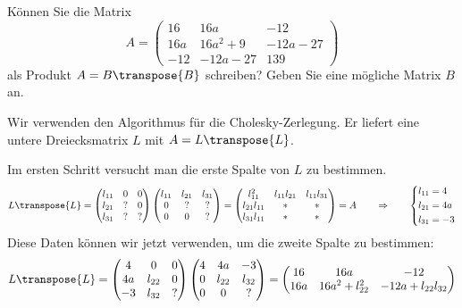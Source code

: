 Können Sie die Matrix
\[
A=\begin{pmatrix}
16& 16a&-12\\
16a&16a^2+9&-12a-27\\
-12& -12a-27&139
\end{pmatrix}
\]
als Produkt $A=B\transpose{B}$ schreiben? Geben Sie eine mögliche Matrix $B$ an.


\begin{loesung}
Wir verwenden den Algorithmus für die Cholesky-Zerlegung. Er liefert eine 
untere Dreiecksmatrix $L$ mit $A = L\transpose{L}$.

Im ersten Schritt versucht man die erste Spalte von $L$ zu bestimmen.
\[
L\transpose{L}=
\begin{pmatrix}
l_{11}&  0&  0\\
l_{21}&  ?&  0\\
l_{31}&  ?&  ?
\end{pmatrix}
\begin{pmatrix}
l_{11}&l_{21}&l_{31}\\
     0&     ?&     ?\\
     0&     0&     ?
\end{pmatrix}
=
\begin{pmatrix}
    l_{11}^2&l_{11}l_{21}&l_{11}l_{31}\\
l_{21}l_{11}&           *&           *\\
l_{31}l_{11}&           *&           *
\end{pmatrix}
=
A
\qquad\Rightarrow\qquad
\left\{
\begin{aligned}
l_{11}&=4\\
l_{21}&=4a\\
l_{31}&=-3
\end{aligned}
\right.
\]
Diese Daten können wir jetzt verwenden, um die zweite Spalte zu bestimmen:
\[
L\transpose{L}
=
\begin{pmatrix}
4&     0&0\\
4a&l_{22}&0\\
-3&l_{32}&?
\end{pmatrix}
\begin{pmatrix}
4&    4a&    -3\\
0&l_{22}&l_{32}\\
0&     0&?
\end{pmatrix}
=
\begin{pmatrix}
16&16a           &          -12\\
16a&16a^2+l_{22}^2  &-12a+l_{22}l_{32}\\

\end{pmatrix}\]
\end{loesung}
